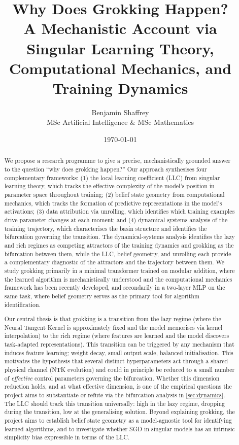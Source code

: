 \documentclass[11pt,a4paper]{article}
\title{\textbf{Why Does Grokking Happen?} \\ 
\large A Mechanistic Account via Singular Learning Theory, \\
Computational Mechanics, and Training Dynamics}
\author{Benjamin Shaffrey \\
MSc Artificial Intelligence \& MSc Mathematics}
\date{\today}
\begin{document}
\maketitle

\begin{abstract}
We propose a research programme to give a precise, mechanistically grounded answer to the question ``why does grokking happen?'' Our approach synthesises four complementary frameworks: (1) the local learning coefficient (LLC) from singular learning theory, which tracks the effective complexity of the model's position in parameter space throughout training; (2) belief state geometry from computational mechanics, which tracks the formation of predictive representations in the model's activations; (3) data attribution via unrolling, which identifies which training examples drive parameter changes at each moment; and (4) dynamical systems analysis of the training trajectory, which characterises the basin structure and identifies the bifurcation governing the transition. The dynamical-systems analysis identifies the lazy and rich regimes as competing attractors of the training dynamics and grokking as the bifurcation between them, while the LLC, belief geometry, and unrolling each provide a complementary diagnostic of the attractors and the trajectory between them. We study grokking primarily in a minimal transformer trained on modular addition, where the learned algorithm is mechanistically understood and the computational mechanics framework has been recently developed, and secondarily in a two-layer MLP on the same task, where belief geometry serves as the primary tool for algorithm identification.

Our central thesis is that grokking is a transition from the lazy regime (where the Neural Tangent Kernel is approximately fixed and the model memorises via kernel interpolation) to the rich regime (where features are learned and the model discovers task-adapted representations). This transition can be triggered by any mechanism that induces feature learning; weight decay, small output scale, balanced initialisation. This motivates the hypothesis that several distinct hyperparameters act through a shared physical channel (NTK evolution) and could in principle be reduced to a small number of \emph{effective} control parameters governing the bifurcation. Whether this dimension reduction holds, and at what effective dimension, is one of the empirical questions the project aims to substantiate or refute via the bifurcation analysis in \cref{sec:dynamics}. The LLC should track this transition universally: high in the lazy regime, dropping during the transition, low at the generalising solution. Beyond explaining grokking, the project aims to establish belief state geometry as a model-agnostic tool for identifying learned algorithms, and to investigate whether SGD in singular models has an intrinsic simplicity bias expressible in terms of the LLC.
\end{abstract}
\end{document}
